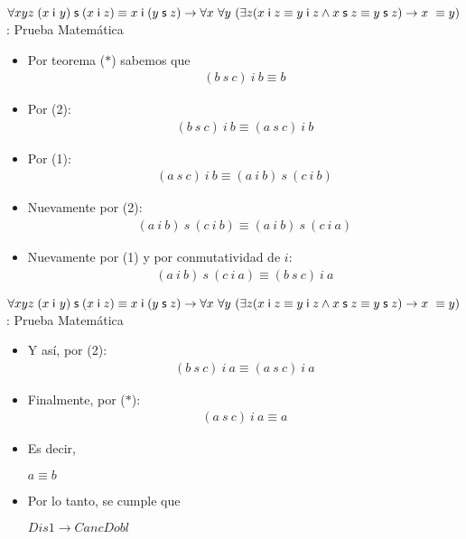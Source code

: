 \documentclass[10pt]{beamer}
\newcommand{\Cfonti}{\fontsize{8.5}{7.2}\selectfont}
\newcommand{\acot}{Dis1\rightarrow CancDobl}
\newcommand{\idistr}{\forall xyz\;(x\;\mathsf{i}\
y)\;\mathsf{s}\;(x\;\mathsf{i}\;z)\equiv x\;\mathsf{i}\;(y\;\mathsf{s}%
\;z)}
\newcommand{\myconj}{x\;\mathsf{i}\;z\equiv y\;\mathsf{%
i}\;z\wedge x\;\mathsf{s}\;z\equiv y\;\mathsf{s}\;z}
\begin{document}
\begin{frame}{\Cfonti$\idistr \rightarrow \forall x\ \forall y\ (\exists z (\myconj) \rightarrow x\ \equiv y)$:
   Prueba Matemática}
  \begin{itemize}[<+->]

    \item Por teorema ($*$) sabemos que
      \begin{align}
        (b\ s\ c)\ i\ b \equiv b
      \end{align}
    \item Por (2):
      \begin{align}
        (b\ s\ c)\ i\ b \equiv (a\ s\ c)\ i\ b
      \end{align}
    \item Por (1):
      \begin{align}
        (a\ s\ c)\ i\ b \equiv (a\ i\ b)\ s\ (c\ i\ b)
      \end{align}
    \item Nuevamente por (2):
      \begin{align}
        (a\ i\ b)\ s\ (c\ i\ b) \equiv (a\ i\ b)\ s\ (c\ i\ a)
      \end{align}

    \item Nuevamente por (1) y por conmutatividad de $i$:
      \begin{align}
        (a\ i\ b)\ s\ (c\ i\ a) \equiv (b\ s\ c)\ i\ a
      \end{align}


  \end{itemize}
\end{frame}


\begin{frame}{\Cfonti$\idistr \rightarrow \forall x\ \forall y\ (\exists z (\myconj) \rightarrow x\ \equiv y)$:
   Prueba Matemática}
  \begin{itemize}[<+->]
    \item Y así, por (2):
      \begin{align}
        (b\ s\ c)\ i\ a \equiv (a\ s\ c)\ i\ a
      \end{align}

    \item Finalmente, por ($*$):
      \begin{align}
        (a\ s\ c)\ i\ a \equiv a
      \end{align}
    \item Es decir,
      \begin{center}
        $a \equiv b$
      \end{center}

    \item Por lo tanto, se cumple que
      \begin{center}
        $\acot$
      \end{center}

  \end{itemize}
\end{frame}
\end{document}
